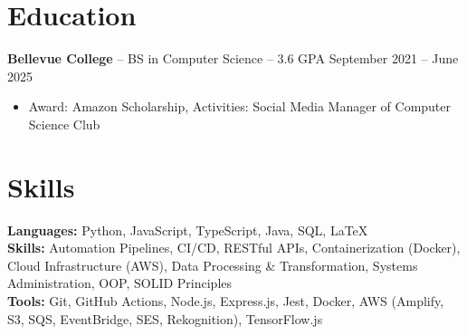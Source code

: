 \documentclass[11pt]{article}
\begin{document}

\vspace{-18.5pt}

\section*{Education}
\textbf{Bellevue College} -- BS in Computer Science -- 3.6 GPA \hfill September 2021 -- June 2025\\
\vspace{-9pt}
\begin{itemize}
  \item Award: Amazon Scholarship, Activities: Social Media Manager of Computer Science Club
\end{itemize}

\vspace{-18.5pt}

\section*{Skills}
\textbf{Languages:} Python, JavaScript, TypeScript, Java, SQL, LaTeX\\
\textbf{Skills:} Automation Pipelines, CI/CD, RESTful APIs, Containerization (Docker), Cloud Infrastructure (AWS), Data Processing \& Transformation, Systems Administration, OOP, SOLID Principles\\
\textbf{Tools:} Git, GitHub Actions, Node.js, Express.js, Jest, Docker, AWS (Amplify, S3, SQS, EventBridge, SES, Rekognition), TensorFlow.js

\vspace{-6.5pt}
\end{document}
